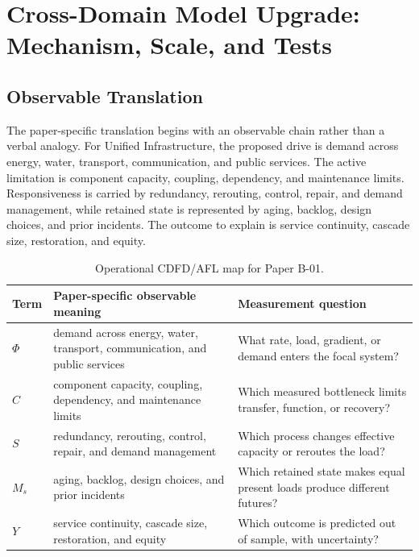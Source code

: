 \documentclass[11pt,a4paper]{article}
\begin{document}
\section{Cross-Domain Model Upgrade: Mechanism, Scale, and Tests}

\subsection{Observable Translation}

The paper-specific translation begins with an observable chain rather than a
verbal analogy. For Unified Infrastructure, the proposed drive is demand across energy, water, transport, communication, and public services.
The active limitation is component capacity, coupling, dependency, and maintenance limits. Responsiveness is carried by
redundancy, rerouting, control, repair, and demand management, while retained state is represented by
aging, backlog, design choices, and prior incidents. The outcome to explain is service continuity, cascade size, restoration, and equity.

\begin{table}[htbp]
\centering
\small
\caption{Operational CDFD/AFL map for Paper B-01.}
\begin{tabularx}{\textwidth}{|l|X|X|}
\hline
\textbf{Term} & \textbf{Paper-specific observable meaning} & \textbf{Measurement question} \\
\hline
$\Phi$ & demand across energy, water, transport, communication, and public services & What rate, load, gradient, or demand enters the focal system? \\
\hline
$C$ & component capacity, coupling, dependency, and maintenance limits & Which measured bottleneck limits transfer, function, or recovery? \\
\hline
$S$ & redundancy, rerouting, control, repair, and demand management & Which process changes effective capacity or reroutes the load? \\
\hline
$M_s$ & aging, backlog, design choices, and prior incidents & Which retained state makes equal present loads produce different futures? \\
\hline
$Y$ & service continuity, cascade size, restoration, and equity & Which outcome is predicted out of sample, with uncertainty? \\
\hline
\end{tabularx}
\end{table}
\end{document}
